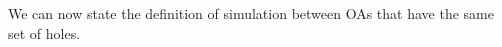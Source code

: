 \documentclass[runningheads]{llncs}
\begin{document}
We can now state the definition of simulation between OAs that have the same set of holes. 
\end{document}

